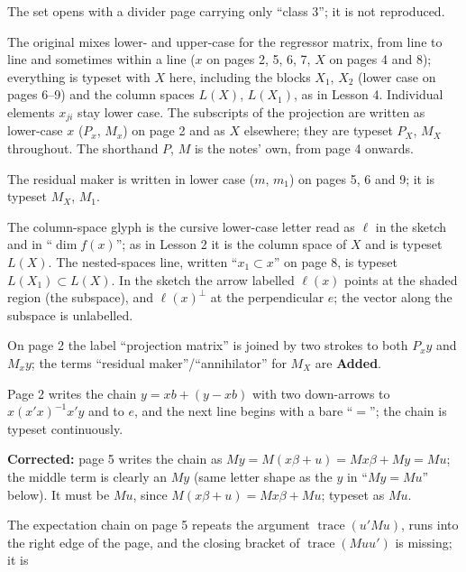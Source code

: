 \documentclass[11pt]{article}
\begin{document}
\begin{transcriptnotes}
  \item The set opens with a divider page carrying only ``class 3''; it is not
        reproduced.
  \item The original mixes lower- and upper-case for the regressor matrix, from
        line to line and sometimes within a line ($x$ on pages 2, 5, 6, 7, $X$ on
        pages 4 and 8); everything is typeset with $X$ here, including the blocks $X_{1}$, $X_{2}$
        (lower case on pages 6--9) and the column spaces $L(X)$, $L(X_{1})$, as in
        Lesson 4. Individual elements $x_{ji}$ stay lower case. The subscripts of
        the projection are written as lower-case $x$ ($P_{x}$, $M_{x}$) on page 2
        and as $X$ elsewhere; they are typeset $P_{X}$, $M_{X}$ throughout. The
        shorthand $P$, $M$ is the notes' own, from page 4 onwards.
  \item The residual maker is written in lower case ($m$, $m_{1}$) on pages 5, 6
        and 9; it is typeset $M_{X}$, $M_{1}$.
  \item The column-space glyph is the cursive lower-case letter read as $\ell$ in
        the sketch and in ``$\dim f(x)$''; as in Lesson 2 it is the column space
        of $X$ and is typeset $L(X)$. The nested-spaces line, written
        ``$x_{1} \subset x$'' on page 8, is typeset
        $L(X_{1}) \subset L(X)$. In the sketch the arrow labelled $\ell(x)$ points
        at the shaded region (the subspace), and $\ell(x)^{\perp}$ at the
        perpendicular $e$; the vector along the subspace is unlabelled.
  \item On page 2 the label ``projection matrix'' is joined by two strokes to
        both $P_{x}y$ and $M_{x}y$; the terms ``residual maker''/``annihilator''
        for $M_{X}$ are \textbf{Added}.
  \item Page 2 writes the chain $y = xb + (y-xb)$ with two down-arrows to
        $x(x'x)^{-1}x'y$ and to $e$, and the next line begins with a bare ``$=$'';
        the chain is typeset continuously.
  \item \textbf{Corrected:} page 5 writes the chain as
        $My = M(x\beta+u) = Mx\beta + My = Mu$; the middle term is clearly an
        $My$ (same letter shape as the $y$ in ``$My = Mu$'' below). It must be
        $Mu$, since $M(x\beta+u) = Mx\beta + Mu$; typeset as $Mu$.
  \item The expectation chain on page 5 repeats the argument
        $\operatorname{trace}(u'Mu)$, runs into the right edge of the page, and
        the closing bracket of $\operatorname{trace}(Muu')$ is missing; it is

\end{transcriptnotes}
\end{document}
